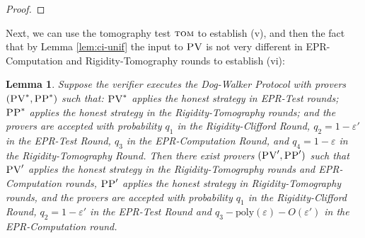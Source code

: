 \documentclass[11pt,letter]{article}
\newtheorem{lemma}[theorem]{Lemma}
\theoremstyle{remark}
\theoremstyle{definition}
\newcommand{\eps}{\varepsilon}
\newcommand{\tom}{\textsc{tom}}
\newcommand{\pv}{\textsc{PV}}
\newcommand{\pp}{\textsc{PP}}
\newcommand{\anote}[1]{\textcolor{blue}{\small {\textbf{(Andrea:} #1 \textbf{) }}}}
\begin{document}
\begin{proof}
\end{proof}

Next, we can use the tomography test $\tom$ to establish (v), and then the fact that by Lemma \ref{lem:ci-unif} the input to $\pv$ is not very different in EPR-Computation and Rigidity-Tomography rounds to establish (vi):

\begin{lemma}\label{lem:PV-34}
Suppose the verifier executes the Dog-Walker Protocol with provers $(\pv^*,\pp^*)$ such that: $\pv^*$ applies the honest strategy in EPR-Test rounds; 
$\pp^*$ applies the honest strategy in the Rigidity-Tomography rounds; and the provers are accepted with probability $q_1$ in the Rigidity-Clifford Round, $q_2 = 1-\eps'$ in the EPR-Test Round, $q_3$ in the EPR-Computation Round, and $q_4=1-\eps$ in the Rigidity-Tomography Round. Then there exist provers $(\pv',\pp')$ such that $\pv'$ applies the honest strategy in the Rigidity-Tomography rounds and EPR-Computation rounds, $\pp'$ applies the honest strategy in Rigidity-Tomography rounds, and
the provers are accepted with probability $q_1$ in the Rigidity-Clifford Round, $q_2 = 1-\eps'$ in the EPR-Test Round and $q_3-\mathrm{poly}(\eps)-O(\eps')$ in the EPR-Computation round. 
\end{lemma}
\end{document}
